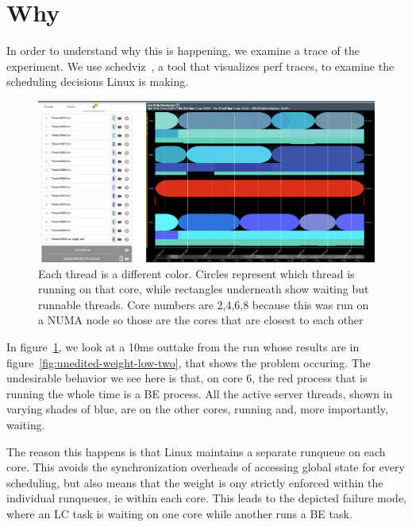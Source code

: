 
\section{Why}
\label{sec:why}

In order to understand why this is happening, we examine a trace of the
experiment. We use schedviz~\cite{schedviz}, a tool that visualizes perf traces,
to examine the scheduling decisions Linux is making.

\begin{figure}[t]
    \centering
    \includegraphics[width=\textwidth]{graphs/schedviz.png}
        \caption{Each thread is a different color. Circles represent which
    thread is running on that core, while rectangles underneath show waiting but
    runnable threads. Core numbers are 2,4,6,8 because this was run on a NUMA
    node so those are the cores that are closest to each other
    }\label{fig:schedviz}
\end{figure}

In figure~\ref{fig:schedviz}, we look at a 10ms outtake from the run whose
results are in figure~\ref{fig:unedited-weight-low-two}, that
shows the problem occuring. The undesirable behavior we see here is that, on
core 6, the red process that is running the whole time is a BE process. All the
active server threads, shown in varying shades of blue, are on the other cores,
running and, more importantly, waiting.~

The reason this happens is that Linux maintains a separate runqueue on each
core. This avoids the synchronization overheads of accessing global state for
every scheduling, but also means that the weight is ony strictly enforced within
the individual runqueues, ie within each core. This leads to the depicted
failure mode, where an LC task is waiting on one core while another runs a BE
task.

